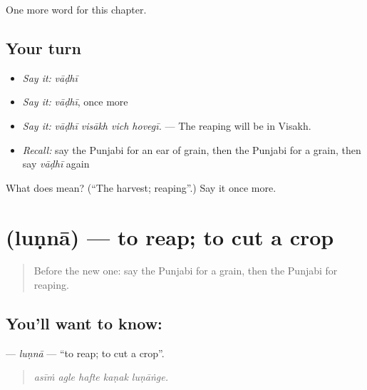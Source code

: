 \begin{grammarlens}[title={What you've built}]
One more word for this chapter.
\end{grammarlens}

\subsection*{Your turn}
\begin{itemize}
\raggedright
  \item \emph{Say it:} \emph{vāḍhī}
  \item \emph{Say it:} \emph{vāḍhī}, once more
  \item \emph{Say it:} \emph{vāḍhī visākh vich hovegī.} — The reaping will be in Visakh.
  \item \emph{Recall:} say the Punjabi for an ear of grain, then the Punjabi for a grain, then say \emph{vāḍhī} again
\end{itemize}

\begin{tcolorbox}[breakable,colback=teal!4,colframe=teal!35!black,title={Before you move on}]
What does  mean? (\textquotedblleft{}The harvest; reaping\textquotedblright{}.) Say it once more.
\end{tcolorbox}
\section[\texorpdfstring{\pa{ਲੁਣਨਾ} (luṇnā)}{ਲੁਣਨਾ (luṇnā)}]{ (luṇnā) — to reap; to cut a crop}

\label{lesson:PA-C305-lunna}



\begin{quote}
Before the new one: say the Punjabi for a grain, then the Punjabi for reaping.
\end{quote}

\subsection*{You'll want to know: }
\textbf{} — \emph{luṇnā} — \textquotedblleft{}to reap; to cut a crop\textquotedblright{}.

\begin{quote}
    
\end{quote}

\begin{quote}
\emph{asīṁ agle hafte kaṇak luṇāṅge.}
\end{quote}

